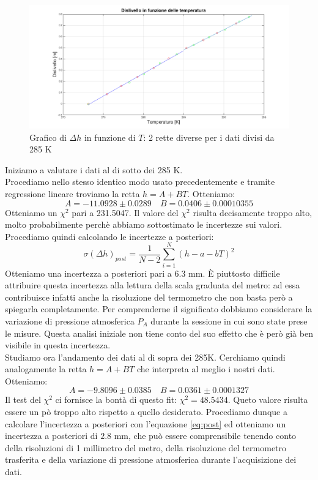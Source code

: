 \begin{figure}[H]
\centering
\includegraphics[width=\textwidth]{img/2}
\caption{Grafico di $\Delta h$ in funzione di $T$: 2 rette diverse per i dati divisi da 285 K}
\end{figure}

Iniziamo a valutare i dati al di sotto dei 285 K.\\
Procediamo nello stesso identico modo usato precedentemente e tramite regressione lineare troviamo la retta $h = A+BT$.
Otteniamo:
\[A = -11.0928 \pm 0.0289 \quad  B = 0.0406\pm 0.00010355\]
Otteniamo un $\chi^2$ pari a 231.5047. 
Il valore del $\chi^2$ risulta decisamente troppo alto, molto probabilmente perchè abbiamo sottostimato le incertezze sui valori.
Procediamo quindi calcolando le incertezze a posteriori:
\begin{equation}
\label{eq:post}
\sigma(\Delta h)_{post} = \frac{1}{N-2}\sum_{i=1}^N(h-a-bT)^2
\end{equation}
Otteniamo una incertezza a posteriori pari a $6.3$ mm. 
È piuttosto difficile attribuire questa incertezza alla lettura della scala graduata del metro: ad essa contribuisce infatti anche la risoluzione del termometro che non basta però a spiegarla completamente. 
Per comprenderne il significato dobbiamo considerare la variazione di pressione atmosferica $P_A$ durante la sessione in cui sono state prese le misure. 
Questa analisi iniziale non tiene conto del suo effetto che è però già ben visibile in questa incertezza.\\
\newline
Studiamo ora l'andamento dei dati al di sopra dei 285K. 
Cerchiamo quindi analogamente la retta $h = A+BT$ che interpreta al meglio i nostri dati. 
Otteniamo:
\[A = -9.8096 \pm 0.0385 \quad  B = 0.0361 \pm 0.0001327\]
Il test del $\chi^2$ ci fornisce la bontà di questo fit: $\chi^2 = 48.5434$. 
Queto valore risulta essere un pò troppo alto rispetto a quello desiderato. 
Procediamo dunque a calcolare l'incertezza a posteriori con l'equazione \eqref{eq:post} ed otteniamo un incertezza a posteriori di $2.8$ mm, che può essere comprensibile tenendo conto della risoluzioni di 1 millimetro del metro, della risoluzione del termometro trasferita e della variazione di pressione atmosferica durante l'acquisizione dei dati.



